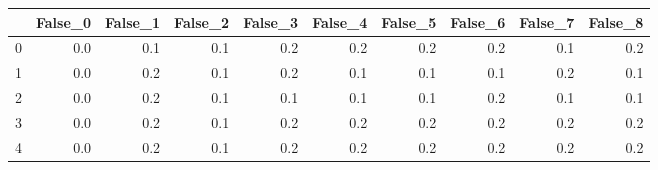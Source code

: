 \begin{tabular}{lrrrrrrrrr}
\toprule
{} &  False\_0 &  False\_1 &  False\_2 &  False\_3 &  False\_4 &  False\_5 &  False\_6 &  False\_7 &  False\_8 \\ \hline
\midrule
0 &      0.0 &      0.1 &      0.1 &      0.2 &      0.2 &      0.2 &      0.2 &      0.1 &      0.2 \\ \hline
1 &      0.0 &      0.2 &      0.1 &      0.2 &      0.1 &      0.1 &      0.1 &      0.2 &      0.1 \\ \hline
2 &      0.0 &      0.2 &      0.1 &      0.1 &      0.1 &      0.1 &      0.2 &      0.1 &      0.1 \\ \hline
3 &      0.0 &      0.2 &      0.1 &      0.2 &      0.2 &      0.2 &      0.2 &      0.2 &      0.2 \\ \hline
4 &      0.0 &      0.2 &      0.1 &      0.2 &      0.2 &      0.2 &      0.2 &      0.2 &      0.2 \\ \hline
\bottomrule
\end{tabular}
